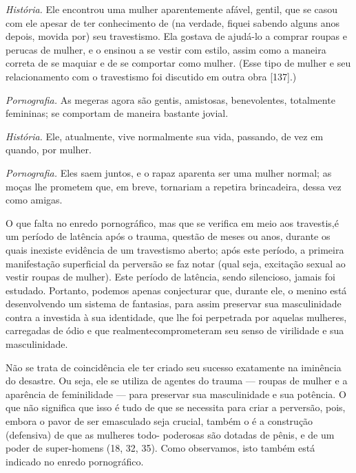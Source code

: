 \textit{História.} Ele encontrou uma mulher aparentemente afável,
gentil, que se casou com ele apesar de ter conhecimento de (na verdade,
fiquei sabendo alguns anos depois, movida por) seu travestismo. Ela
gostava de ajudá-lo a comprar roupas e perucas de mulher, e o ensinou a
se vestir com estilo, assim como a maneira correta de se maquiar e de
se comportar como mulher. (Esse tipo de mulher e seu relacionamento com
o travestismo foi discutido em outra obra [137].)

\textit{Pornografia.} As megeras agora são gentis, amistosas,
benevolentes, totalmente femininas; se comportam de maneira bastante
jovial.


\textit{História.} Ele, atualmente, vive normalmente sua vida,
passando, de vez em quando, por mulher.

\textit{Pornografia.} Eles saem juntos, e o rapaz aparenta ser uma
mulher normal; as moças lhe prometem que, em breve, tornariam a repetir\idxtraumatrav[|)]
a brincadeira, dessa vez como amigas.\idxpornoreal[|)]

O que falta no enredo pornográfico, mas que se verifica em meio aos
travestis,\idxcastatrav[|(] é um período de latência\idxtravemperi{} após o trauma, questão de meses ou
anos, durante os quais inexiste evidência de um travestismo aberto;
após este período, a primeira manifestação superficial da perversão se
faz notar (qual seja, excitação sexual ao vestir roupas de mulher).
Este período de latência, sendo silencioso, jamais foi estudado.
Portanto, podemos apenas conjecturar que, durante ele, o menino está
desenvolvendo um sistema de fantasias, para assim preservar sua
masculinidade contra a investida à sua identidade, que lhe foi
perpetrada por aquelas mulheres, carregadas de ódio e que realmente\idxtravempape[|)]
comprometeram seu senso de virilidade e sua masculinidade.

Não se trata de coincidência ele ter criado seu sucesso exatamente
na iminência do desastre. Ou seja, ele se utiliza de agentes do trauma
--- roupas de mulher e a aparência de feminilidade --- para preservar
sua masculinidade e sua potência. O que não significa que isso é tudo
de que se necessita para criar a perversão, pois, embora o pavor de ser
emasculado seja crucial, também o é a construção (defensiva) de que as
mulheres todo- poderosas são dotadas de pênis, e de um poder de
super-homens (18, 32, 35). Como observamos, isto também está indicado
no enredo pornográfico.

